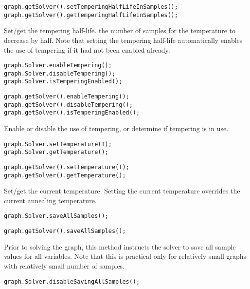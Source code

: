 \ifjava
\begin{lstlisting}
graph.getSolver().setTemperingHalfLifeInSamples();
graph.getSolver().getTemperingHalfLifeInSamples();
\end{lstlisting}
\fi


Set/get the tempering half-life.  the number of samples for the temperature to decrease by half. Note that setting the tempering half-life automatically enables the use of tempering if it had not been enabled already.

\ifmatlab
\begin{lstlisting}
graph.Solver.enableTempering();
graph.Solver.disableTempering();
graph.Solver.isTemperingEnabled();
\end{lstlisting}
\fi

\ifjava
\begin{lstlisting}
graph.getSolver().enableTempering();
graph.getSolver().disableTempering();
graph.getSolver().isTemperingEnabled();
\end{lstlisting}
\fi

Enable or disable the use of tempering, or determine if tempering is in use.

\ifmatlab
\begin{lstlisting}
graph.Solver.setTemperature(T);
graph.Solver.getTemperature();
\end{lstlisting}
\fi

\ifjava
\begin{lstlisting}
graph.getSolver().setTemperature(T);
graph.getSolver().getTemperature();
\end{lstlisting}
\fi

Set/get the current temperature. Setting the current temperature overrides the current annealing temperature.

\ifmatlab
\begin{lstlisting}
graph.Solver.saveAllSamples();
\end{lstlisting}
\fi

\ifjava
\begin{lstlisting}
graph.getSolver().saveAllSamples();
\end{lstlisting}
\fi

Prior to solving the graph, this method instructs the solver to save all sample values for all variables. Note that this is practical only for relatively small graphs with relatively small number of samples.

\ifmatlab
\begin{lstlisting}
graph.Solver.disableSavingAllSamples();
\end{lstlisting}
\fi

